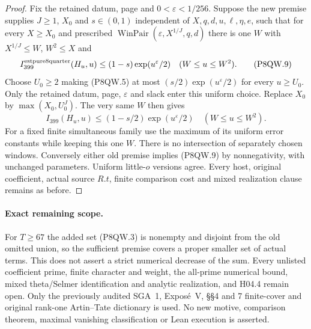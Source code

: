 \begin{proof}
Fix the retained datum, page and $0<\varepsilon<1/256$.
Suppose the new premise supplies $J\geq1$, $X_0$ and
$s\in(0,1)$ independent of $X,q,d,u,\ell,\eta,e$, such that
for every $X\geq X_0$ and prescribed
$\operatorname{WinPair}(\varepsilon,X^{1/J},q,d)$ there is
one $W$ with $X^{1/J}\leq W$, $W^2\leq X$ and
\[
 I_{399}^{\rm estpure8quarter}(H_u,u)\leq(1-s)\exp(u^\varepsilon/2)
                                      \quad(W\leq u\leq W^2).
 \tag{P8QW.9}
\]
Choose $U_0\geq2$ making (P8QW.5) at most
$(s/2)\exp(u^\varepsilon/2)$ for every $u\geq U_0$.
Only the retained datum, page, $\varepsilon$ and slack enter
this uniform choice.  Replace $X_0$ by $\max(X_0,U_0^J)$.
The very same $W$ then gives
\[
 I_{399}(H_u,u)\leq(1-s/2)\exp(u^\varepsilon/2)
                                      \quad(W\leq u\leq W^2).
 \tag{P8QW.10}
\]
For a fixed finite simultaneous family use the maximum of its
uniform error constants while keeping this one $W$.
There is no intersection of separately chosen windows.
Conversely either old premise implies (P8QW.9) by nonnegativity,
with unchanged parameters.  Uniform little-$o$ versions agree.
Every host, original coefficient, actual source $R.t$, finite
comparison cost and mixed realization clause remains as before.
\end{proof}

\paragraph{Exact remaining scope.}
For $T\geq67$ the added set (P8QW.3) is nonempty and disjoint
from the old omitted union, so the sufficient premise covers a
proper smaller set of actual terms.
This does not assert a strict numerical decrease of the sum.
Every unlisted coefficient prime, finite character and weight,
the all-prime numerical bound, mixed theta/Selmer identification
and analytic realization, and H04.4 remain open.
Only the previously audited SGA~1, Expos\'e~V, \S\S4 and 7
finite-cover and original rank-one Artin--Tate dictionary is used.
No new motive, comparison theorem, maximal vanishing classification
or Lean execution is asserted.
